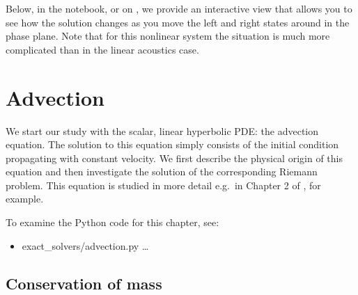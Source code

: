 \documentclass{SIAMbook2016}
\providecommand{\tightlist}{%
      \setlength{\itemsep}{0pt}\setlength{\parskip}{0pt}}
\begin{document}
Below, in the notebook, or on
, we provide an interactive view that allows you to see how the
solution changes as you move the left and right states around in the
phase plane. Note that for this nonlinear system the situation is much
more complicated than in the linear acoustics case.

            
\hypertarget{advection}{%
\chapter{Advection}\label{advection}}
\label{sec:02-Advection}
We start our study with the scalar, linear hyperbolic PDE: the advection
equation. The solution to this equation simply consists of the initial
condition propagating with constant velocity. We first describe the
physical origin of this equation and then investigate the solution of
the corresponding Riemann problem. This equation is studied in more
detail e.g.~in Chapter 2 of \cite{fvmhp}, for example.

To examine the Python code for this chapter, see:

\begin{itemize}
\tightlist
\item
  {exact\_solvers/advection.py} \ldots{}
\end{itemize}

\hypertarget{conservation-of-mass}{%
\section{Conservation of mass}\label{conservation-of-mass}}
\end{document}
